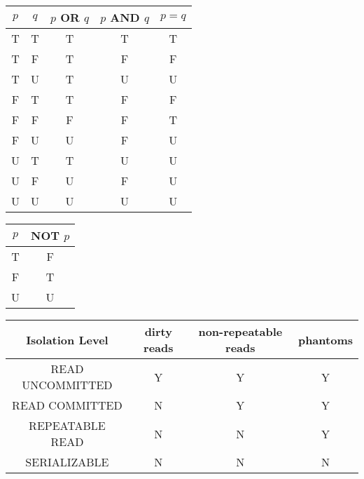 \documentclass[landscape,8pt]{extarticle}
\begin{document}
\begin{multicols}{4}
\begin{center}
\begin{tabular}{ | c | c | c | c | c | } \hline
    $p$ & $q$ & $p$ OR $q$ & $p$ AND $q$ & $p = q$ \\ \hline
    T & T & T & T & T \\ \hline
    T & F & T & F & F \\ \hline
    T & U & T & U & U \\ \hline
    F & T & T & F & F \\ \hline
    F & F & F & F & T \\ \hline
    F & U & U & F & U \\ \hline
    U & T & T & U & U \\ \hline
    U & F & U & F & U \\ \hline
    U & U & U & U & U \\ \hline
\end{tabular}
\end{center}
\begin{center}
    \begin{tabular}{| c | c |} \hline
        $p$ & NOT $p$ \\ \hline
        T & F \\ \hline
        F & T \\ \hline
        U & U \\ \hline
    \end{tabular}
\end{center}
\begin{center}
    \begin{adjustbox}{angle=270}
    \begin{tabular}{| c | c | c | c |} \hline
        Isolation Level & dirty reads & non-repeatable reads & phantoms \\ \hline
        READ UNCOMMITTED & Y & Y & Y \\ \hline
        READ COMMITTED & N & Y & Y \\ \hline
        REPEATABLE READ & N & N & Y \\ \hline
        SERIALIZABLE & N & N & N \\ \hline
    \end{tabular}
\end{adjustbox}
\end{center}
    \end{multicols}
\end{document}
